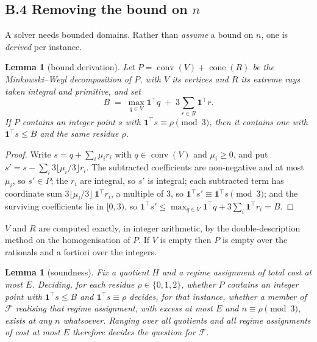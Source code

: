 \documentclass[11pt]{amsart}
\newtheorem{lemma}[theorem]{Lemma}
\theoremstyle{remark}
\begin{document}
\subsection*{B.4 Removing the bound on $n$}

A solver needs bounded domains. Rather than \emph{assume} a bound on $n$, one
is \emph{derived} per instance.

\begin{lemma}[bound derivation]\label{lem:mw}
Let $P = \operatorname{conv}(V) + \operatorname{cone}(R)$ be the
Minkowski--Weyl decomposition of $P$, with $V$ its vertices and $R$ its
extreme rays taken integral and primitive, and set
\[
B \;=\; \max_{q \in V} \mathbf{1}^{\!\top} q
   \;+\; 3 \sum_{r \in R} \mathbf{1}^{\!\top} r .
\]
If $P$ contains an integer point $s$ with $\mathbf{1}^{\!\top} s \equiv \rho
\pmod 3$, then it contains one with $\mathbf{1}^{\!\top} s \le B$ and the same
residue $\rho$.
\end{lemma}

\begin{proof}
Write $s = q + \sum_i \mu_i r_i$ with $q \in \operatorname{conv}(V)$ and
$\mu_i \ge 0$, and put $s' = s - \sum_i 3\lfloor \mu_i/3 \rfloor r_i$. The
subtracted coefficients are non-negative and at most $\mu_i$, so $s' \in P$;
the $r_i$ are integral, so $s'$ is integral; each subtracted term has
coordinate sum $3 \lfloor \mu_i/3 \rfloor \, \mathbf{1}^{\!\top} r_i$, a
multiple of $3$, so $\mathbf{1}^{\!\top} s' \equiv \mathbf{1}^{\!\top} s
\pmod 3$; and the surviving coefficients lie in $[0,3)$, so
$\mathbf{1}^{\!\top} s' \le \max_{q \in V}\mathbf{1}^{\!\top} q +
3 \sum_i \mathbf{1}^{\!\top} r_i = B$.
\end{proof}

$V$ and $R$ are computed exactly, in integer arithmetic, by the
double-description method on the homogenisation of $P$. If $V$ is empty then
$P$ is empty over the rationals and a fortiori over the integers.

\begin{lemma}[soundness]\label{lem:blowsound}
Fix a quotient $H$ and a regime assignment of total cost at most $E$. Deciding,
for each residue $\rho \in \{0,1,2\}$, whether $P$ contains an integer point
with $\mathbf{1}^{\!\top}s \le B$ and $\mathbf{1}^{\!\top}s \equiv \rho$
decides, for that instance, whether a member of $\mathcal{F}$ \emph{realising
that regime assignment}, with excess at most $E$ and $n \equiv \rho \pmod 3$,
exists \emph{at any $n$ whatsoever}. Ranging over all quotients and all regime
assignments of cost at most $E$ therefore decides the question for
$\mathcal{F}$.
\end{lemma}
\end{document}
